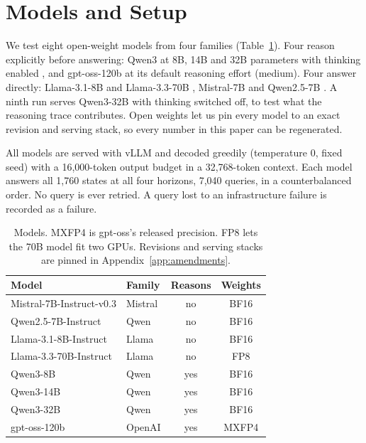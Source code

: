\section{Models and Setup}
\label{sec:setup}

We test eight open-weight models from four families (Table~\ref{tab:models}). Four reason explicitly before answering: Qwen3 at 8B, 14B and 32B parameters with thinking enabled \citep{yang2025qwen3}, and gpt-oss-120b \citep{openai2025gptoss} at its default reasoning effort (medium). Four answer directly: Llama-3.1-8B and Llama-3.3-70B \citep{dubey2024llama}, Mistral-7B \citep{jiang2023mistral} and Qwen2.5-7B \citep{qwen2025qwen25}. A ninth run serves Qwen3-32B with thinking switched off, to test what the reasoning trace contributes. Open weights let us pin every model to an exact revision and serving stack, so every number in this paper can be regenerated.

All models are served with vLLM \citep{kwon2023vllm} and decoded greedily (temperature 0, fixed seed) with a 16,000-token output budget in a 32,768-token context. Each model answers all 1,760 states at all four horizons, 7,040 queries, in a counterbalanced order. No query is ever retried. A query lost to an infrastructure failure is recorded as a failure.

\begin{table}[t]
\centering
\small
\setlength{\tabcolsep}{3.5pt}
\begin{tabular}{@{}llcc@{}}
\toprule
Model & Family & Reasons & Weights \\
\midrule
Mistral-7B-Instruct-v0.3 & Mistral & no & BF16 \\
Qwen2.5-7B-Instruct & Qwen & no & BF16 \\
Llama-3.1-8B-Instruct & Llama & no & BF16 \\
Llama-3.3-70B-Instruct & Llama & no & FP8 \\
Qwen3-8B & Qwen & yes & BF16 \\
Qwen3-14B & Qwen & yes & BF16 \\
Qwen3-32B & Qwen & yes & BF16 \\
gpt-oss-120b & OpenAI & yes & MXFP4 \\
\bottomrule
\end{tabular}
\caption{Models. MXFP4 is gpt-oss's released precision. FP8 lets the 70B model fit two GPUs. Revisions and serving stacks are pinned in Appendix~\ref{app:amendments}.}
\label{tab:models}
\end{table}
